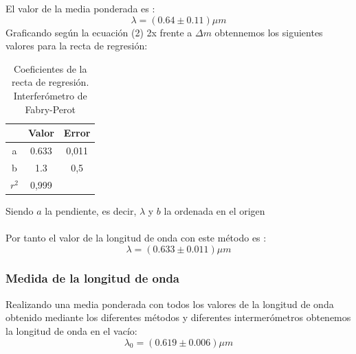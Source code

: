 \documentclass[11pt,letterpaper,twocolumn]{article}
\begin{document}
El valor de la media ponderada es :
\begin{equation}
    \boxed{\lambda=\left( 0.64 \pm 0.11 \right)\mu m }
\end{equation}
Graficando según la ecuación (2) 2x frente a $\Delta m$ obtennemos los siguientes valores para la recta de regresión: 
\begin{table}[H]
    \centering
    \begin{tabular}{|c|c|c|}
        \hline
         & Valor &  Error \\ \hline
        a & 0.633 & 0,011 \\ \hline
        b & 1.3 & 0,5 \\ \hline
        $r^2$ & 0,999 &  \\ \hline
    \end{tabular}
    \label{}
    \caption{Coeficientes de la recta de regresión. Interferómetro de Fabry-Perot}
\end{table}
Siendo $a$ la pendiente, es decir, $\lambda$ y $b$ la ordenada en el origen\\
\\
Por tanto el valor de la longitud de onda con este método es :
\begin{equation}
    \boxed{\lambda=\left( 0.633 \pm 0.011 \right)  \mu m}
\end{equation}
\subsubsection{Medida de la longitud de onda}
Realizando una media ponderada con todos los valores de la longitud de onda obtenido mediante los diferentes métodos y diferentes intermerómetros obtenemos la longitud de onda en el vacío:
\begin{equation}
    \boxed{\lambda_{0}= (0.619 \pm 0.006) \mu m}
\end{equation}
\end{document}
